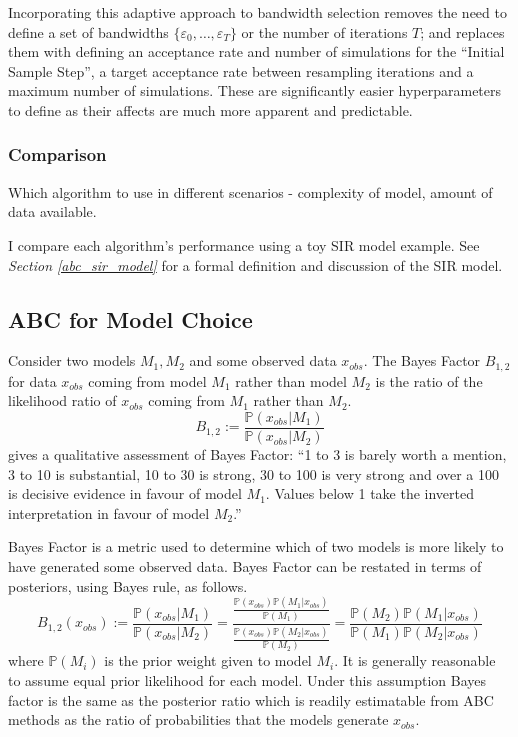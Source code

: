 \documentclass[11pt,a4paper]{article}
\newcommand*{\prob}{\mathbb{P}}
\theoremstyle{break}
\begin{document}
  \par Incorporating this adaptive approach to bandwidth selection removes the need to define a set of bandwidths $\{\varepsilon_0,\dots,\varepsilon_T\}$ or the number of iterations $T$; and replaces them with defining an acceptance rate and number of simulations for the ``Initial Sample Step'', a target acceptance rate between resampling iterations and a maximum number of simulations. These are significantly easier hyperparameters to define as their affects are much more apparent and predictable.


\subsubsection{Comparison}\label{sec_abc_comparison}

  Which algorithm to use in different scenarios - complexity of model, amount of data available.

  \par I compare each algorithm's performance using a toy SIR model example. See \textit{Section \ref{abc_sir_model}} for a formal definition and discussion of the SIR model.

\subsection{ABC for Model Choice}\label{sec_abc_model_choice}

  \begin{box_definition}
    Consider two models $M_1,M_2$ and some observed data $x_{obs}$. The Bayes Factor $B_{1,2}$ for data $x_{obs}$ coming from model $M_1$ rather than model $M_2$ is the ratio of the likelihood ratio of $x_{obs}$ coming from $M_1$ rather than $M_2$.
    \[ B_{1,2}:=\frac{\prob(x_{obs}|M_1)}{\prob(x_{obs}|M_2)} \]
    \cite[]{theory_of_probability} gives a qualitative assessment of Bayes Factor: ``1 to 3 is barely worth a mention, 3 to 10 is substantial, 10 to 30 is strong, 30 to 100 is very strong and over a 100 is decisive evidence in favour of model $M_1$. Values below 1 take the inverted interpretation in favour of model $M_2$.''
    \par
  \end{box_definition}

  Bayes Factor is a metric used to determine which of two models is more likely to have generated some observed data. Bayes Factor can be restated in terms of posteriors, using Bayes rule, as follows.
  \[ B_{1,2}(x_{obs}):=\frac{\prob(x_{obs}|M_1)}{\prob(x_{obs}|M_2)}=\frac{\frac{\prob(x_{obs})\prob(M_1|x_{obs})}{\prob(M_1)}}{\frac{\prob(x_{obs})\prob(M_2|x_{obs})}{\prob(M_2)}}=\frac{\prob(M_2)\prob(M_1|x_{obs})}{\prob(M_1)\prob(M_2|x_{obs})} \]
  where $\prob(M_i)$ is the prior weight given to model $M_i$. It is generally reasonable to assume equal prior likelihood for each model. Under this assumption Bayes factor is the same as the posterior ratio which is readily estimatable from ABC methods as the ratio of probabilities that the models generate $x_{obs}$.
\end{document}
